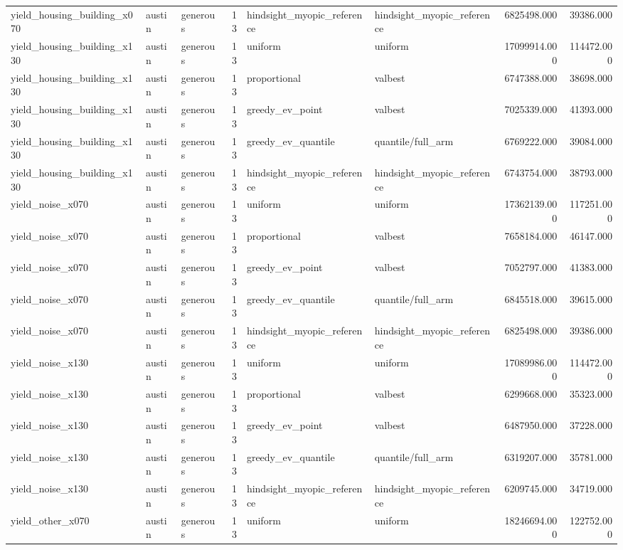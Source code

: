 \begin{tabular}{lllrllrr}
yield\_housing\_building\_x070 & austin & generous & 13 & hindsight\_myopic\_reference & hindsight\_myopic\_reference & 6825498.000 & 39386.000 \\
yield\_housing\_building\_x130 & austin & generous & 13 & uniform & uniform & 17099914.000 & 114472.000 \\
yield\_housing\_building\_x130 & austin & generous & 13 & proportional & valbest & 6747388.000 & 38698.000 \\
yield\_housing\_building\_x130 & austin & generous & 13 & greedy\_ev\_point & valbest & 7025339.000 & 41393.000 \\
yield\_housing\_building\_x130 & austin & generous & 13 & greedy\_ev\_quantile & quantile/full\_arm & 6769222.000 & 39084.000 \\
yield\_housing\_building\_x130 & austin & generous & 13 & hindsight\_myopic\_reference & hindsight\_myopic\_reference & 6743754.000 & 38793.000 \\
yield\_noise\_x070 & austin & generous & 13 & uniform & uniform & 17362139.000 & 117251.000 \\
yield\_noise\_x070 & austin & generous & 13 & proportional & valbest & 7658184.000 & 46147.000 \\
yield\_noise\_x070 & austin & generous & 13 & greedy\_ev\_point & valbest & 7052797.000 & 41383.000 \\
yield\_noise\_x070 & austin & generous & 13 & greedy\_ev\_quantile & quantile/full\_arm & 6845518.000 & 39615.000 \\
yield\_noise\_x070 & austin & generous & 13 & hindsight\_myopic\_reference & hindsight\_myopic\_reference & 6825498.000 & 39386.000 \\
yield\_noise\_x130 & austin & generous & 13 & uniform & uniform & 17089986.000 & 114472.000 \\
yield\_noise\_x130 & austin & generous & 13 & proportional & valbest & 6299668.000 & 35323.000 \\
yield\_noise\_x130 & austin & generous & 13 & greedy\_ev\_point & valbest & 6487950.000 & 37228.000 \\
yield\_noise\_x130 & austin & generous & 13 & greedy\_ev\_quantile & quantile/full\_arm & 6319207.000 & 35781.000 \\
yield\_noise\_x130 & austin & generous & 13 & hindsight\_myopic\_reference & hindsight\_myopic\_reference & 6209745.000 & 34719.000 \\
yield\_other\_x070 & austin & generous & 13 & uniform & uniform & 18246694.000 & 122752.000 \\

\end{tabular}
